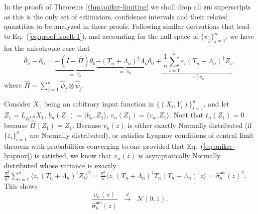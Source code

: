 \documentclass[11pt,a4paper]{article}
\renewcommand{\hat}{\widehat}
\theoremstyle{definition}
\theoremstyle{plain}
\theoremstyle{remark}
\newcommand{\ani}{\mathsf{ani}}
\begin{document}
In the proofs of Theorems \ref{thm:anikrr-limiting} we shall drop all $\ani$ superscripts as this is the only set of estimators, confidence intervals and their related quantities to be analyzed in these proofs.
Following similar derivations that lead to Eq.~(\ref{eq:proof-isoclt-1}), and accounting for the null space of $\{\hat\psi_j\}_{j=1}^n$, we have for the anisotropic case that
\begin{equation}
\hat\theta_n-\theta_0 =\underbrace{-(I-\hat\Pi)\theta_0}_{=:t_n}\underbrace{- (T_n+\Lambda_n)^{\dagger}\Lambda_n\theta_0}_{=: b_n} + \underbrace{\frac{1}{n}\sum_{i=1}^n\varepsilon_i(T_n+\Lambda_n)^{\dagger}Z_i}_{=:v_n},
\label{eq:proof-aniclt-1}
\end{equation}
where $\hat\Pi = \sum_{j=1}^n\hat\psi_j\otimes\hat\psi_j$.

Consider $X_1$ being an arbitrary input function in $\{(X_i,Y_i)\}_{i=1}^n$,
and let $Z_1=L_{K^{1/2}}X_1$, $b_n(Z_1)=\langle b_n,Z_1\rangle$, $v_n(Z_1)=\langle v_n,Z_1\rangle$.
Noet that $t_n(Z_1)=0$ because $\hat\Pi(Z_1)=Z_1$.
Because $v_n(z)$ is either exactly Normally distributed (if $\{\varepsilon_i\}_{i=1}^n$ are Normally distributed), or satisfies Lyapnov conditions of central limit theorem with probabilities converging to one
provided that Eq.~(\ref{eq:anikrr-lyapnov}) is satisfied, we know that $v_n(z)$ is asymptotically Normally distributed whose variance is exactly $\frac{\sigma_\varepsilon^2}{n^2}\sum_{i=1}^n\langle z, (T_n+\Lambda_n)^{\dagger}Z_i\rangle^2 = \frac{\sigma_\varepsilon^2}{n}\langle z, (T_n+\Lambda_n)^{\dagger}T_n(T_n+\Lambda_n)^{\dagger}z\rangle=\hat\sigma_n^\ani(z)^2$. This shows
\begin{equation}
\frac{v_n(z)}{\hat\sigma_n^\ani(z)}\;\;\overset{d}{\to}\;\;\mathcal N(0,1).
\label{eq:proof-aniclt-2}
\end{equation}
\end{document}
